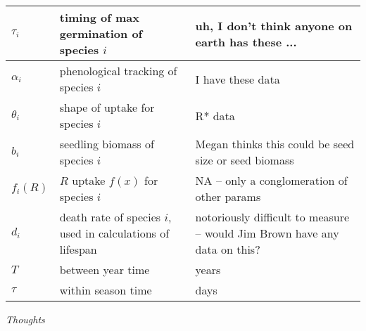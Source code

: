 \documentclass[11pt,a4paper,oneside]{article}
\begin{document}
\begin{center}
\begin{table}[h!]
\begin{tabular}{ | p{3.0cm} | p{6.0cm} | p{4.0cm} |}
\(\tau_{i}\) & timing of max germination of species \(i\) & uh, I don't think anyone on earth has these ...\\ \hline
\(\alpha_{i}\) & phenological tracking of species \(i\) & I have these data \\ \hline
\(\theta_{i}\) & shape of uptake for species \(i\) & R* data\\ \hline
\hline
\(b_{i}\) & seedling biomass of species \(i\) & Megan thinks this could be seed size or seed biomass \\ \hline
\(f_{i}(R)\) & \(R\) uptake \(f(x)\) for species \(i\) & NA -- only a conglomeration of other params\\ \hline
\(d_{i}\) & death rate of species \(i\), used in calculations of lifespan & notoriously difficult to measure -- would Jim Brown have any data on this? \\ \hline
\(T\) & between year time & years \\ \hline
\(\tau\) & within season time & days \\ \hline
\hline
\end{tabular}
\end{table}
\end{center}

\newpage
\noindent \emph{Thoughts}\\
\end{document}
